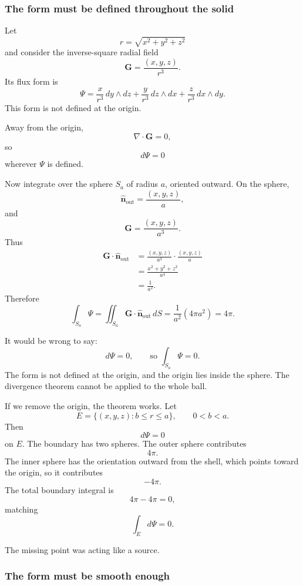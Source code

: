 \subsubsection*{The form must be defined throughout the solid}

Let
\[
    r=\sqrt{x^2+y^2+z^2}
\]
and consider the inverse-square radial field
\[
    \mathbf G=\frac{(x,y,z)}{r^3}.
\]
Its flux form is
\[
    \Psi=
    \frac{x}{r^3}\,dy\wedge dz
    +
    \frac{y}{r^3}\,dz\wedge dx
    +
    \frac{z}{r^3}\,dx\wedge dy.
\]
This form is not defined at the origin.

Away from the origin,
\[
    \nabla\cdot\mathbf G=0,
\]
so
\[
    d\Psi=0
\]
wherever \(\Psi\) is defined.

Now integrate over the sphere \(S_a\) of radius \(a\), oriented outward.  On the sphere,
\[
    \widehat{\mathbf n}_{\mathrm{out}}=\frac{(x,y,z)}{a},
\]
and
\[
    \mathbf G=\frac{(x,y,z)}{a^3}.
\]
Thus
\[
\begin{aligned}
    \mathbf G\cdot\widehat{\mathbf n}_{\mathrm{out}}
    &=
    \frac{(x,y,z)}{a^3}\cdot\frac{(x,y,z)}{a}\\
    &=
    \frac{x^2+y^2+z^2}{a^4}\\
    &=
    \frac1{a^2}.
\end{aligned}
\]
Therefore
\[
\boxed{
    \int_{S_a}\Psi
    =
    \iint_{S_a}\mathbf G\cdot\widehat{\mathbf n}_{\mathrm{out}}\,dS
    =
    \frac1{a^2}(4\pi a^2)
    =
    4\pi.
}
\]

It would be wrong to say:
\[
    d\Psi=0,
    \qquad
    \text{so } \int_{S_a}\Psi=0.
\]
The form is not defined at the origin, and the origin lies inside the sphere.  The
divergence theorem cannot be applied to the whole ball.

If we remove the origin, the theorem works.  Let
\[
    E=\{(x,y,z):b\le r\le a\},
    \qquad
    0<b<a.
\]
Then
\[
    d\Psi=0
\]
on \(E\).  The boundary has two spheres.  The outer sphere contributes
\[
    4\pi.
\]
The inner sphere has the orientation outward from the shell, which points toward the
origin, so it contributes
\[
    -4\pi.
\]
The total boundary integral is
\[
    4\pi-4\pi=0,
\]
matching
\[
    \int_E d\Psi=0.
\]

The missing point was acting like a source.

\subsubsection*{The form must be smooth enough}

